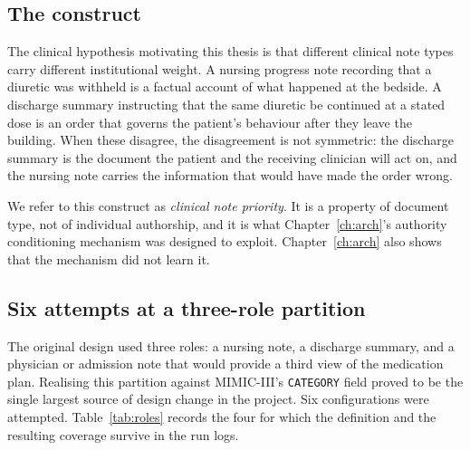 \subsection{The construct}

The clinical hypothesis motivating this thesis is that different clinical note
types carry different institutional weight. A nursing progress note recording
that a diuretic was withheld is a factual account of what happened at the
bedside. A discharge summary instructing that the same diuretic be continued at
a stated dose is an order that governs the patient's behaviour after they leave
the building. When these disagree, the disagreement is not symmetric: the
discharge summary is the document the patient and the receiving clinician will
act on, and the nursing note carries the information that would have made the
order wrong.

We refer to this construct as \emph{clinical note priority}. It is a property of
document type, not of individual authorship, and it is what
Chapter~\ref{ch:arch}'s authority conditioning mechanism was designed to
exploit. Chapter~\ref{ch:arch} also shows that the mechanism did not learn it.

\subsection{Six attempts at a three-role partition}

The original design used three roles: a nursing note, a discharge summary, and a
physician or admission note that would provide a third view of the medication
plan. Realising this partition against MIMIC-III's \texttt{CATEGORY} field
proved to be the single largest source of design change in the project. Six
configurations were attempted. Table~\ref{tab:roles} records the four for which
the definition and the resulting coverage survive in the run logs.

